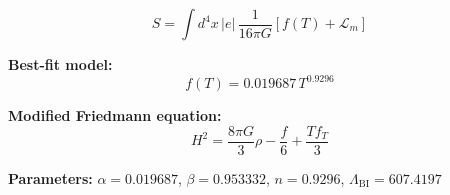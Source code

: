 
\begin{equation}
  S = \int d^4x \, |e| \, \frac{1}{16\pi G} \left[ f(T) + \mathcal{L}_m \right]
\end{equation}

\textbf{Best-fit model:}
\begin{equation}
  f(T) = 0.019687 \, T^{0.9296}
\end{equation}

\textbf{Modified Friedmann equation:}
\begin{equation}
  H^2 = \frac{8\pi G}{3} \rho - \frac{f}{6} + \frac{T f_T}{3}
\end{equation}

\textbf{Parameters:}
$\alpha = 0.019687$, \quad
$\beta = 0.953332$, \quad
$n = 0.9296$, \quad
$\Lambda_{\text{BI}} = 607.4197$